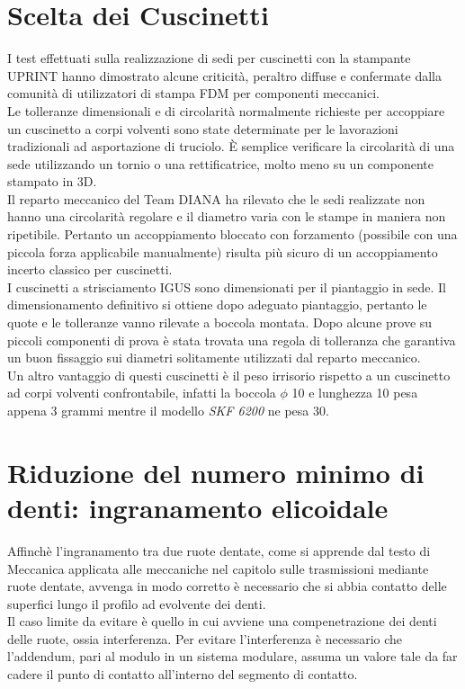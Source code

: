 \documentclass[%
corpo=11pt,
twoside,
 stile=classica,
oldstyle,
greek,%
]{toptesi}
\begin{document}
	\section{Scelta dei Cuscinetti}
	I test effettuati sulla realizzazione di sedi per cuscinetti con la stampante UPRINT hanno dimostrato alcune criticità, peraltro diffuse e confermate dalla comunità di utilizzatori di stampa FDM per componenti meccanici. \\
	Le tolleranze dimensionali e di circolarità normalmente richieste per accoppiare un cuscinetto a corpi volventi sono state determinate per le lavorazioni tradizionali ad asportazione di truciolo. \`E semplice verificare la circolarità di una sede utilizzando un tornio o una rettificatrice, molto meno su un componente stampato in 3D. \\
	Il reparto meccanico del Team DIANA ha rilevato che le sedi realizzate non hanno una circolarità regolare e il diametro varia con le stampe in maniera non ripetibile. Pertanto un accoppiamento bloccato con forzamento (possibile con una piccola forza applicabile manualmente) risulta più sicuro di un accoppiamento incerto classico per cuscinetti. \\
	I cuscinetti a strisciamento IGUS sono dimensionati per il piantaggio in sede. Il dimensionamento definitivo si ottiene dopo adeguato piantaggio, pertanto le quote e le tolleranze vanno rilevate a boccola montata.
	Dopo alcune prove su piccoli componenti di prova è stata trovata una regola di tolleranza che garantiva un buon fissaggio sui diametri solitamente utilizzati dal reparto meccanico. \\
	Un altro vantaggio di questi cuscinetti è il peso irrisorio rispetto a un cuscinetto ad corpi volventi confrontabile, infatti la boccola $\phi$ 10 e lunghezza 10 pesa appena 3 grammi mentre il modello \textit{SKF 6200} ne pesa 30. 
	
	
	
	\section{Riduzione del numero minimo di denti: ingranamento elicoidale}\label{denti}
	Affinchè l'ingranamento tra due ruote dentate, come si apprende dal testo di Meccanica applicata alle meccaniche \cite{Jacazioteo} nel capitolo sulle trasmissioni mediante ruote dentate, avvenga in modo corretto è necessario che si abbia contatto delle superfici lungo il profilo ad evolvente dei denti. \\
	Il caso limite da evitare è quello in cui avviene una compenetrazione dei denti delle ruote, ossia interferenza. Per evitare l'interferenza è necessario che l'addendum, pari al modulo in un sistema modulare, assuma un valore tale da far cadere il punto di contatto all'interno del segmento di contatto. \\
	
\end{document}
